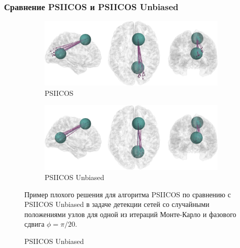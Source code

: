 \documentclass[12pt]{beamer}
\begin{document}
\begin{frame}[t]
    \frametitle{Сравнение PSIICOS и PSIICOS Unbiased}
    
    \vspace{1cm}
    \begin{figure}[htbp]
        \begin{subfigure}[t]{0.49\textwidth}
            \includegraphics[width=0.99\textwidth]{../images/bias_brain_PSIICOS.jpg}
            \caption{PSIICOS}\label{fig:bias_brain_psiicos}
        \end{subfigure}
        \begin{subfigure}[t]{0.49\textwidth}
            \includegraphics[width=0.99\textwidth]{../images/bias_brain_PSIICOS_Unbiased.jpg}
            \caption{PSIICOS Unbiased}\label{fig:bias_brain_psiicos_unbiased}
        \end{subfigure}
        {\tiny Пример плохого решения для алгоритма PSIICOS по сравнению с
            PSIICOS Unbiased в задаче детекции сетей со случайными положениями
            узлов для одной из итераций Монте-Карло и фазового сдвига
            $\phi=\pi/20$.
        }
    \end{figure}

\end{frame}
\end{document}
